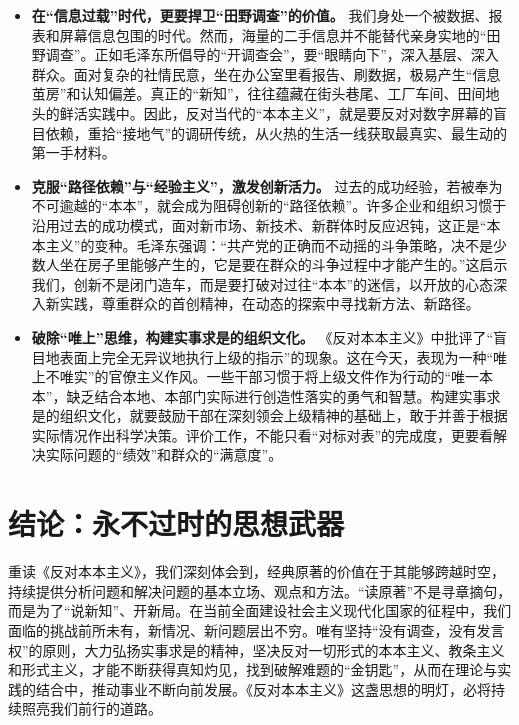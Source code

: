 \documentclass[a4paper,12pt]{article}
\begin{document}
\begin{itemize}
    \item \textbf{在“信息过载”时代，更要捍卫“田野调查”的价值。}
  我们身处一个被数据、报表和屏幕信息包围的时代。然而，海量的二手信息并不能替代亲身实地的“田野调查”。正如毛泽东所倡导的“开调查会”，要“眼睛向下”，深入基层、深入群众。面对复杂的社情民意，坐在办公室里看报告、刷数据，极易产生“信息茧房”和认知偏差。真正的“新知”，往往蕴藏在街头巷尾、工厂车间、田间地头的鲜活实践中。因此，反对当代的“本本主义”，就是要反对对数字屏幕的盲目依赖，重拾“接地气”的调研传统，从火热的生活一线获取最真实、最生动的第一手材料。
    \item \textbf{克服“路径依赖”与“经验主义”，激发创新活力。}
    过去的成功经验，若被奉为不可逾越的“本本”，就会成为阻碍创新的“路径依赖”。许多企业和组织习惯于沿用过去的成功模式，面对新市场、新技术、新群体时反应迟钝，这正是“本本主义”的变种。毛泽东强调：“共产党的正确而不动摇的斗争策略，决不是少数人坐在房子里能够产生的，它是要在群众的斗争过程中才能产生的。”这启示我们，创新不是闭门造车，而是要打破对过往“本本”的迷信，以开放的心态深入新实践，尊重群众的首创精神，在动态的探索中寻找新方法、新路径。

    \item \textbf{破除“唯上”思维，构建实事求是的组织文化。}
    《反对本本主义》中批评了“盲目地表面上完全无异议地执行上级的指示”的现象。这在今天，表现为一种“唯上不唯实”的官僚主义作风。一些干部习惯于将上级文件作为行动的“唯一本本”，缺乏结合本地、本部门实际进行创造性落实的勇气和智慧。构建实事求是的组织文化，就要鼓励干部在深刻领会上级精神的基础上，敢于并善于根据实际情况作出科学决策。评价工作，不能只看“对标对表”的完成度，更要看解决实际问题的“绩效”和群众的“满意度”。

\end{itemize}
 
\section{结论：永不过时的思想武器}
 重读《反对本本主义》，我们深刻体会到，经典原著的价值在于其能够跨越时空，持续提供分析问题和解决问题的基本立场、观点和方法。“读原著”不是寻章摘句，而是为了“说新知”、开新局。在当前全面建设社会主义现代化国家的征程中，我们面临的挑战前所未有，新情况、新问题层出不穷。唯有坚持“没有调查，没有发言权”的原则，大力弘扬实事求是的精神，坚决反对一切形式的本本主义、教条主义和形式主义，才能不断获得真知灼见，找到破解难题的“金钥匙”，从而在理论与实践的结合中，推动事业不断向前发展。《反对本本主义》这盏思想的明灯，必将持续照亮我们前行的道路。
\end{document}
